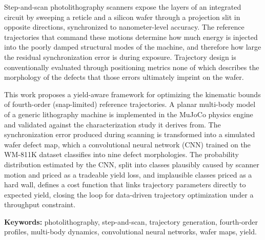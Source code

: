 \def\baselinestretch{1.0}

Step-and-scan photolithography scanners expose the layers of an integrated circuit by sweeping a reticle and a silicon wafer through a projection slit in opposite directions, synchronized to nanometer-level accuracy. The reference trajectories that command these motions determine how much energy is injected into the poorly damped structural modes of the machine, and therefore how large the residual synchronization error is during exposure. Trajectory design is conventionally evaluated through positioning metrics none of which describes the morphology of the defects that those errors ultimately imprint on the wafer.

This work proposes a yield-aware framework for optimizing the kinematic bounds of fourth-order (snap-limited) reference trajectories. A planar multi-body model of a generic lithography machine is implemented in the MuJoCo physics engine and validated against the characterization study it derives from. The synchronization error produced during scanning is transformed into a simulated wafer defect map, which a convolutional neural network (CNN) trained on the WM-811K dataset classifies into nine defect morphologies. The probability distribution estimated by the CNN, split into classes plausibly caused by scanner motion and priced as a tradeable yield loss, and implausible classes priced as a hard wall, defines a cost function that links trajectory parameters directly to expected yield, closing the loop for data-driven trajectory optimization under a throughput constraint.

\textbf{Keywords:} photolithography, step-and-scan, trajectory generation,
fourth-order profiles, multi-body dynamics, convolutional neural networks, wafer maps, yield.

